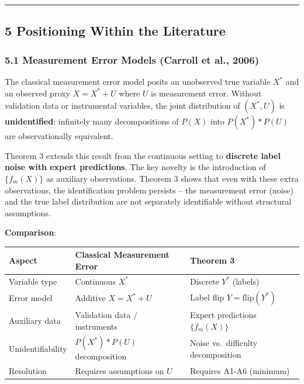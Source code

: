 \documentclass[
  12pt,
]{ctexart}
\begin{document}
\begin{center}\rule{0.5\linewidth}{0.5pt}\end{center}

\subsection{5 Positioning Within the
Literature}\label{positioning-within-the-literature}

\subsubsection{5.1 Measurement Error Models (Carroll et al.,
2006)}\label{measurement-error-models-carroll-et-al.-2006}

The classical measurement error model posits an unobserved true variable
\(X^*\) and an observed proxy \(X = X^* + U\) where \(U\) is measurement
error. Without validation data or instrumental variables, the joint
distribution of \((X^*, U)\) is \textbf{unidentified}: infinitely many
decompositions of \(P(X)\) into \(P(X^*) * P(U)\) are observationally
equivalent.

Theorem 3 extends this result from the continuous setting to
\textbf{discrete label noise with expert predictions}. The key novelty
is the introduction of \(\{f_m(X)\}\) as auxiliary observations. Theorem
3 shows that even with these extra observations, the identification
problem persists -- the measurement error (noise) and the true label
distribution are not separately identifiable without structural
assumptions.

\textbf{Comparison}:

\begin{longtable}[]{@{}
  >{\raggedright\arraybackslash}p{}
  >{\raggedright\arraybackslash}p{}
  >{\raggedright\arraybackslash}p{}@{}}
\toprule\noalign{}
\begin{minipage}[b]{\linewidth}\raggedright
Aspect
\end{minipage} & \begin{minipage}[b]{\linewidth}\raggedright
Classical Measurement Error
\end{minipage} & \begin{minipage}[b]{\linewidth}\raggedright
Theorem 3
\end{minipage} \\
\midrule\noalign{}
\endhead
\bottomrule\noalign{}
\endlastfoot
Variable type & Continuous \(X^*\) & Discrete \(Y^*\) (labels) \\
Error model & Additive \(X = X^* + U\) & Label flip
\(Y = \text{flip}(Y^*)\) \\
Auxiliary data & Validation data / instruments & Expert predictions
\(\{f_m(X)\}\) \\
Unidentifiability & \(P(X^*) * P(U)\) decomposition & Noise
vs.~difficulty decomposition \\
Resolution & Requires assumptions on \(U\) & Requires A1-A6 (minimum) \\
\end{longtable}
\end{document}
